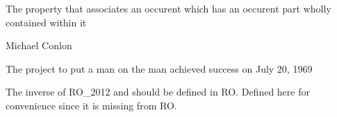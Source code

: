 \documentclass[letterpaper,10pt,english]{sphinxmanual}
\begin{document}
\begin{sphinxShadowBox}

\sphinxAtStartPar
{\hyperref[\detokenize{doc-BFO_0000051::doc}]{}}
\end{sphinxShadowBox}

\begin{sphinxShadowBox}

\sphinxAtStartPar
The property that associates an occurent which has an occurent part wholly contained within it
\end{sphinxShadowBox}

\begin{sphinxShadowBox}

\sphinxAtStartPar
Michael Conlon 
\end{sphinxShadowBox}

\begin{sphinxShadowBox}

\sphinxAtStartPar
{\hyperref[\detokenize{doc-BFO_0000003::doc}]{}}
\end{sphinxShadowBox}

\begin{sphinxShadowBox}

\sphinxAtStartPar
{\hyperref[\detokenize{doc-BFO_0000003::doc}]{}}
\end{sphinxShadowBox}

\begin{sphinxShadowBox}

\sphinxAtStartPar
{\hyperref[\detokenize{doc-RO_0002012::doc}]{}}
\end{sphinxShadowBox}

\begin{sphinxShadowBox}

\sphinxAtStartPar
The project to put a man on the man achieved success on July 20, 1969
\end{sphinxShadowBox}

\begin{sphinxShadowBox}

\sphinxAtStartPar
The inverse of RO\_2012 and should be defined in RO.  Defined here for convenience since it is missing from RO.
\end{sphinxShadowBox}
\end{document}
